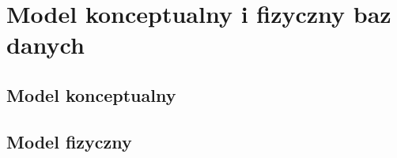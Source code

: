 \chapter{Model konceptualny i fizyczny baz danych}

\section{Model konceptualny}

\section{Model fizyczny}